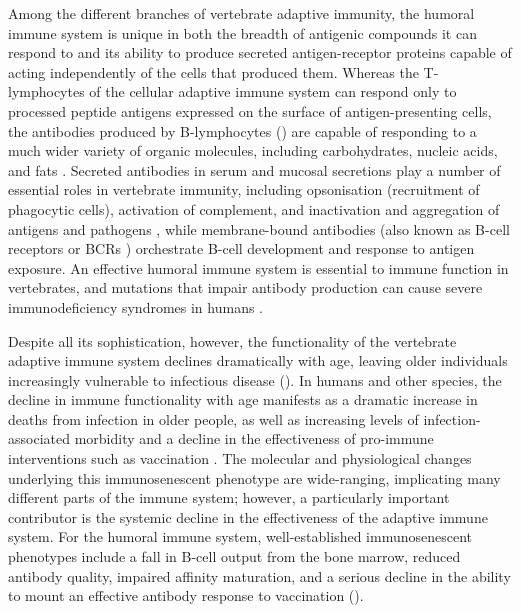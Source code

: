 Among the different branches of vertebrate adaptive immunity, the humoral immune system is unique in both the breadth of antigenic compounds it can respond to and its ability to produce secreted antigen-receptor proteins capable of acting independently of the cells that produced them. Whereas the T-lymphocytes of the cellular adaptive immune system can respond only to processed peptide antigens expressed on the surface of antigen-presenting cells, the antibodies produced by B-lymphocytes () are capable of responding to a much wider variety of organic molecules, including carbohydrates, nucleic acids, and fats \parencite{sompayrac2019immune}. Secreted antibodies in serum and mucosal secretions play a number of essential roles in vertebrate immunity, including opsonisation (recruitment of phagocytic cells), activation of complement, and inactivation and aggregation of antigens and pathogens \parencite{schroeder2010immunoglobulins}, while membrane-bound antibodies (also known as B-cell receptors or BCRs \parencite{bengten2015fishantibodies}) orchestrate B-cell development and response to antigen exposure. An effective humoral immune system is essential to immune function in vertebrates, and mutations that impair antibody production can cause severe immunodeficiency syndromes in humans \parencite{vanzelm2006cd19}.

Despite all its sophistication, however, the functionality of the vertebrate adaptive immune system declines dramatically with age, leaving older individuals increasingly vulnerable to infectious disease (). In humans and other species, the decline in immune functionality with age manifests as a dramatic increase in deaths from infection in older people, as well as increasing levels of infection-associated morbidity and a decline in the effectiveness of pro-immune interventions such as vaccination \parencite{sambhara2009vaccination}. The molecular and physiological changes underlying this immunosenescent phenotype are wide-ranging, implicating many different parts of the immune system; however, a particularly important contributor is the systemic decline in the effectiveness of the adaptive immune system. For the humoral immune system, well-established immunosenescent phenotypes include a fall in \naive B-cell output from the bone marrow, reduced antibody quality, impaired affinity maturation, and a serious decline in the ability to mount an effective antibody response to vaccination ().

